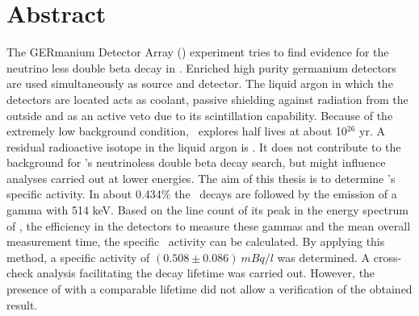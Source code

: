 \documentclass[encoding=utf8,british]{tumphthesis}
\begin{document}



\chapter*{Abstract}
The GERmanium Detector Array (\gerda) experiment tries to find evidence for the neutrino less double beta decay in .
Enriched high purity germanium detectors are used simultaneously as source and detector.
The liquid argon in which the detectors are located acts as coolant, passive shielding against radiation from the outside and as an active veto due to its scintillation capability.
Because of the extremely low background condition, \gerda\ explores half lives at about 10$^{26}$ yr.
A residual radioactive isotope in the liquid argon is .
It does not contribute to the background for \gerda's neutrinoless double beta decay search, but might influence analyses carried out at lower energies.
The aim of this thesis is to determine \Kr's specific activity.
In about 0.434$\%$ the \Kr\ decays are followed by the emission of a gamma with 514 keV.
Based on the line count of its peak in the energy spectrum of \gerda, the efficiency in the detectors to measure these gammas and the mean overall measurement time, the specific \Kr\ activity can be calculated.
By applying this method, a specific activity of $(0.508\pm0.086) \  \unit{mBq}/\unit{l}$ was determined.
A cross-check analysis facilitating the decay lifetime was carried out.
However, the presence of  with a comparable lifetime did not allow a verification of the obtained result.
\end{document}
